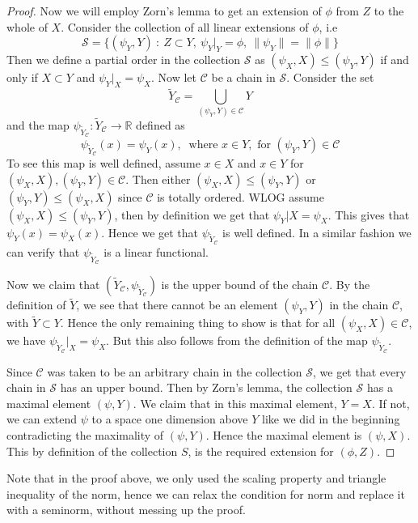 \begin{proof}
  Now we will employ Zorn's lemma to get an extension of $\phi$ from
  $Z$ to the whole of $X$. Consider the collection of all linear
  extensions of $\phi$, i.e \[ \mathcal{S} = \Big \{ (\psi_Y, Y) \ :
  \ Z \subset Y, \ \psi_Y|_Y = \phi, \ \| \psi_Y\| = \|\phi\| \Big \} \]
  Then we define a partial order in the collection $\mathcal{S}$ as
  $(\psi_X, X) \le (\psi_Y, Y)$ if and only if $X \subset Y$ and
  $\psi_Y|_X = \psi_X$. Now let $\mathscr{C}$ be a chain in
  $\mathcal{S}$. Consider the set \[
    \tilde{Y}_\mathscr{C} = \bigcup_{(\psi_Y, Y) \in \mathscr{C}} Y
  \]
  and the map $\psi_{\tilde{Y}_\mathscr{C}}: \tilde{Y}_{\mathscr{C}}
  \to \mathbb{R}$ defined as \[
    \psi_{\tilde{Y}_\mathscr{C}}(x) = \psi_Y(x), \ \textrm{ where } x
    \in Y, \textrm{ for } (\psi_Y, Y) \in \mathscr{C}
  \]
  To see this map is well defined, assume $x \in X$ and $x \in Y$ for
  $(\psi_X, X), (\psi_Y, Y) \in \mathscr{C}$. Then either $(\psi_X,
  X) \le (\psi_Y, Y)$ or $(\psi_Y, Y) \le (\psi_X, X)$ since
  $\mathscr{C}$ is totally ordered. WLOG assume $(\psi_X, X) \le
  (\psi_Y, Y)$, then by definition we get that $\psi_Y|X = \psi_X$.
  This gives that $\psi_Y(x) = \psi_X(x)$. Hence we get that
  $\psi_{\tilde{Y}_{\mathscr{C}}}$ is well defined. In a similar
  fashion we can verify that $\psi_{\tilde{Y}_{\mathscr{C}}}$ is a
  linear functional.

  Now we claim that $(\tilde{Y}_{\mathscr{C}},
  \psi_{\tilde{Y}_\mathscr{C}})$ is the upper bound of the chain
  $\mathscr{C}$. By the definition of $\tilde{Y}$, we see that there
  cannot be an element $(\psi_Y, Y)$ in the chain $\mathscr{ C}$,
  with $\tilde{Y} \subset Y$. Hence the only remaining thing to show
  is that for all $(\psi_X, X) \in \mathscr{ C}$, we have
  $\psi_{\tilde{Y}_\mathscr{C}}|_X = \psi_X$. But this also follows
  from the definition of the map $\psi_{\tilde{Y}_\mathscr{C}}$.

  Since $\mathscr{C}$ was taken to be an arbitrary chain in the
  collection $\mathcal{S}$, we get that every chain in $\mathcal{S}$
  has an upper bound. Then by Zorn's lemma, the collection
  $\mathcal{S}$ has a maximal element $(\psi, Y)$. We claim that in
  this maximal element, $Y = X$. If not, we can extend $\psi$ to a
  space one dimension above $Y$ like we did in the beginning
  contradicting the maximality of $(\psi, Y)$. Hence the maximal
  element is $(\psi, X)$. This by definition of the collection $S$,
  is the required extension for $(\phi, Z)$.
\end{proof}
\begin{remark}
  Note that in the proof above, we only used the scaling property and
  triangle inequality of the norm, hence we can relax the condition
  for norm and replace it with a seminorm, without messing up the proof.
\end{remark}


